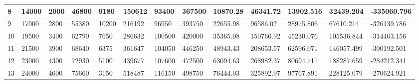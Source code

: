 \begin{table}[]
{\begin{tabular}{|l|l|l|l|l|l|l|l|l|l|l|l|l|}
        8     & 14000     & 2000          & 46800                                                 & 9180                                                           & 150612                                                   & 93400                                                      & 367500                                                          & 10870.28   & 46341.72    & 13902.516     & 32439.204        & -335060.796     \\ \hline
        9     & 17000     & 2800          & 55380                                                 & 10200                                                          & 216192                                                   & 96950                                                      & 393750                                                          & 22655.98   & 96586.02    & 28975.806     & 67610.214        & -326139.786     \\ \hline
        10    & 19500     & 3400          & 62790                                                 & 7650                                                           & 286632                                                   & 100500                                                     & 420000                                                          & 35365.08   & 150766.92   & 45230.076     & 105536.844       & -314463.156     \\ \hline
        11    & 21500     & 3900          & 68640                                                 & 6375                                                           & 361647                                                   & 104050                                                     & 446250                                                          & 48943.43   & 208653.57   & 62596.071     & 146057.499       & -300192.501     \\ \hline
        12    & 23000     & 4300          & 72930                                                 & 5100                                                           & 439677                                                   & 107600                                                     & 472500                                                          & 63094.63   & 268982.37   & 80694.711     & 188287.659       & -284212.341     \\ \hline
        13    & 24000     & 4600          & 75660                                                 & 3150                                                           & 518487                                                   & 116150                                                     & 498750                                                          & 76444.03   & 325892.97   & 97767.891     & 228125.079       & -270624.921     \\ \hline

\end{tabular}}
\end{table}
